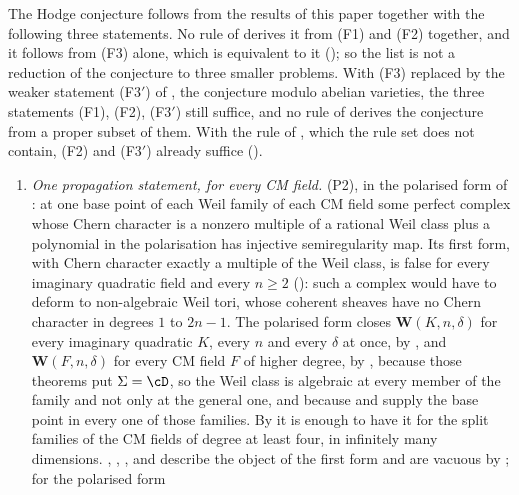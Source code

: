\begin{corollary}\label{cor:fourremain}
The Hodge conjecture follows from the results of this paper together with the
following three statements. No rule of  derives it from
(F1) and (F2) together, and it follows from (F3) alone, which is equivalent
to it
(); so the list is not a reduction of the conjecture to
three smaller problems. With (F3) replaced by the weaker statement
\textup{(F3$'$)} of , the conjecture modulo abelian
varieties, the three statements (F1), (F2), \textup{(F3$'$)} still suffice,
and no rule of  derives the conjecture from a proper
subset of them. With the rule of , which the rule set does
not contain, (F2) and \textup{(F3$'$)} already suffice ().
\begin{enumerate}[label=\textup{(F\arabic*)},leftmargin=3.0em,itemsep=4pt]
\item \emph{One propagation statement, for every CM field.} \textup{(P2)},
  in the polarised form of \cite[Remark~3.6]{paperII}: at one base point of each
  Weil family of each CM field some perfect complex whose Chern character is
  a nonzero multiple of a rational Weil class plus a polynomial in the
  polarisation has injective semiregularity map. Its first form, with Chern
  character exactly a multiple of the Weil class, is false for every
  imaginary quadratic field and every $n\ge2$ (\cite[Theorem~3.5]{paperII}): such a
  complex would have to deform to non-algebraic Weil tori, whose coherent
  sheaves have no Chern character in degrees $1$ to $2n-1$. The polarised form
  closes
  $\mathbf{W}(K,n,\delta)$
  for every imaginary quadratic $K$, every $n$ and every $\delta$ at once, by
  \cite[Theorem~2.3]{paperII}, and
  $\mathbf{W}(F,n,\delta)$ for every CM field $F$ of higher degree, by
  \cite[Theorem~17.7]{paperI}, because those theorems put $\Sigma=\cD$, so the
  Weil class is algebraic at every member of the family and not only at the
  general one, and because \cite[Theorem~15.27]{paperI} and \cite[Theorem~17.5]{paperI}
  supply the base point in every one of those families. By
   it is enough to have it for the split families of the
  CM fields of degree at least four, in infinitely many dimensions.
  \cite[Theorem~2.5]{paperII}, \cite[Theorem~2.13]{paperII}, ,
  \cite[Theorem~2.11]{paperII} and \cite[Theorem~2.14]{paperII} describe the object of the
  first form and are vacuous by \cite[Theorem~3.5]{paperII}; for the polarised form

\end{enumerate}
\end{corollary}
